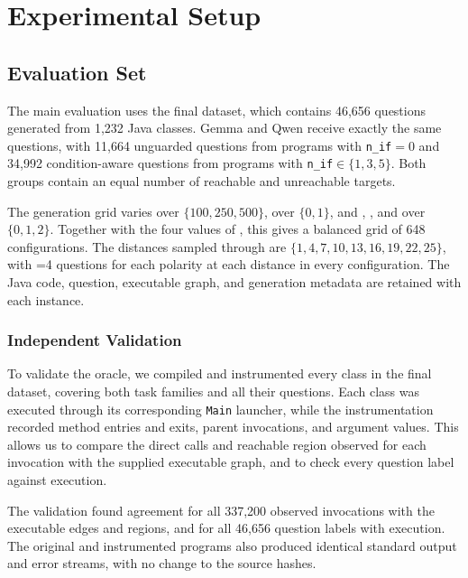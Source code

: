\section{Experimental Setup}
\label{sec:experimental-setup}

\subsection{Evaluation Set}
\label{subsec:evaluation-set}

The main evaluation uses the final \benchmark dataset, which contains 46,656 questions generated from 1,232 Java classes. Gemma and Qwen receive exactly the same questions, with 11,664 unguarded questions from programs with \mbox{\texttt{n\_if}$=0$} and 34,992 condition-aware questions from programs with \mbox{\texttt{n\_if}}$\in\{1,3,5\}$. Both groups contain an equal number of reachable and unreachable targets.

The generation grid varies  over $\{100,250,500\}$,  over $\{0,1\}$, and , , and  over $\{0,1,2\}$. Together with the four values of , this gives a balanced grid of 648 configurations. The distances sampled through  are $\{1,4,7,10,13,16,19,22,25\}$, with =4 questions for each polarity at each distance in every configuration. The Java code, question, executable graph, and generation metadata are retained with each instance.

\subsubsection{Independent Validation}
\label{subsec:oracle-validation}

To validate the oracle, we compiled and instrumented every class in the final \benchmark dataset, covering both task families and all their questions. Each class was executed through its corresponding \texttt{Main} launcher, while the instrumentation recorded method entries and exits, parent invocations, and argument values. This allows us to compare the direct calls and reachable region observed for each invocation with the supplied executable graph, and to check every question label against execution.

The validation found agreement for all 337,200 observed invocations with the executable edges and regions, and for all 46,656 question labels with execution. The original and instrumented programs also produced identical standard output and error streams, with no change to the source hashes.

